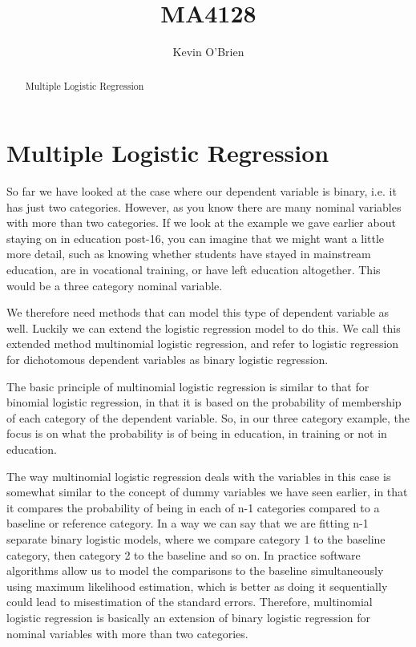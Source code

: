 \documentclass[12pt]{article}
\title{MA4128}
\author{Kevin O'Brien}
\begin{document}
\maketitle

\begin{abstract}
Multiple Logistic Regression
\end{abstract}
\section{Multiple Logistic Regression}
So far we have looked at the case where our dependent variable is binary, i.e. it has just two categories. However, as you know there are many nominal variables with more than two categories. If we look at the example we gave earlier about staying on in education post-16, you can imagine that we might want a little more detail, such as knowing whether students have stayed in mainstream education, are in vocational training, or have left education altogether. This would be a three category nominal variable.

We therefore need methods that can model this type of dependent variable as well. Luckily we can extend the logistic regression model to do this. We call this extended method multinomial logistic regression, and refer to logistic regression for dichotomous dependent variables as binary logistic regression.

The basic principle of multinomial logistic regression is similar to that for binomial logistic regression, in that it is based on the probability of membership of each category of the dependent variable. So, in our three category example, the focus is on what the probability is of being in education, in training or not in education.

The way multinomial logistic regression deals with the variables in this case is somewhat similar to the concept of dummy variables we have seen earlier, in that it compares the probability of being in each of n-1 categories compared to a baseline or reference category. In a way we can say that we are fitting n-1 separate binary logistic models, where we compare category 1 to the baseline category, then category 2 to the baseline and so on. In practice software algorithms allow us to model the comparisons to the baseline simultaneously using maximum likelihood estimation, which is better as doing it sequentially could lead to misestimation of the standard errors. Therefore, multinomial logistic regression is basically an extension of binary logistic regression for nominal variables with more than two categories. 
\end{document}
